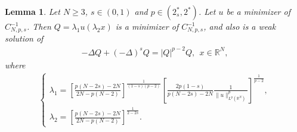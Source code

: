 \documentclass[12pt,a4paper,reqno]{amsart}
\numberwithin{equation}{section}
\newtheorem{lemma}{Lemma}[section]
\begin{document}
\begin{lemma}\label{Lemma3.4}
Let $N\geqslant3$, $s\in(0,1)$ and $p\in (2^{*}_{s},2^{*})$.
Let $u$ be a minimizer of $C_{N,p,s}^{-1}$.
Then $Q=\lambda_{1}u(\lambda_{2}x)$ is a minimizer of $C_{N,p,s}^{-1}$, and also is a weak solution of
\begin{equation*}
\begin{aligned}
-\Delta Q
+(-\Delta)^{s}Q =
|Q|^{p-2}Q, \ \ x\in\mathbb{R}^{N},
\end{aligned}
\end{equation*}
where
\begin{equation*}
\begin{aligned}
\begin{cases}
\lambda_{1}=
\left[
\frac{p(N-2s)-2N}{2N-p(N-2)}
\right]^{\frac{1}{(1-s)(p-2)}}
\left[
\frac{2p(1-s)}{p(N-2s)-2N}
\frac{1}{\|u\|_{L^{p}(\mathbb{R}^{N})}^{p}}
\right]^{\frac{1}{p-2}},\\
\lambda_{2}=
\left[
\frac{p(N-2s)-2N}{2N-p(N-2)}
\right]^{\frac{1}{2-2s}}.
\end{cases}
\end{aligned}
\end{equation*}

\end{lemma}
\end{document}
